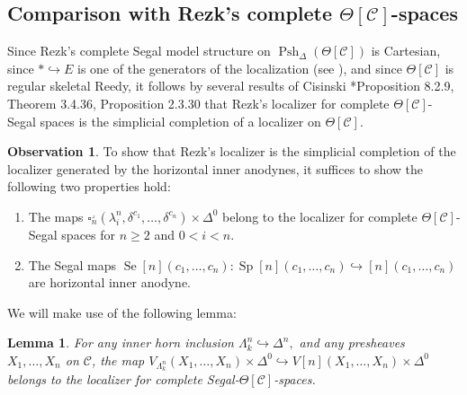 \documentclass[a4paper]{article}
\numberwithin{equation}{subsection}
\theoremstyle{plain}   %
\newtheorem{lemma}[equation]{Lemma}
\theoremstyle{definition}
\newtheorem{obs}[equation]{Observation}
\theoremstyle{remark}
\theoremstyle{plain}
\DeclareMathOperator{\Psh}{Psh}
\providecommand{\C}{}
\renewcommand{\C}{\ensuremath{\mathcal{C}}}
\begin{document}
\subsection{Comparison with Rezk's complete \(\Theta[\C]\)-spaces}\label{rezkcomparison}
Since Rezk's complete Segal model structure on \(\Psh_\Delta(\Theta[\C])\) is Cartesian, since \(\ast \hookrightarrow E\) is one of the generators of the localization (see \cite{rezk-theta-n-spaces}), and since \(\Theta[\C]\) is regular skeletal Reedy, it follows by several results of Cisinski \cite{cisinski-book}*{Proposition 8.2.9, Theorem 3.4.36, Proposition 2.3.30} that Rezk's localizer for complete \(\Theta[\C]\)-Segal spaces is the simplicial completion of a localizer on \(\Theta[\C]\).  
\begin{obs}
	To show that Rezk's localizer is the simplicial completion of the localizer generated by the horizontal inner anodynes, it suffices to show the following two properties hold:
	\begin{enumerate}[leftmargin=3em,label=(\roman*{})] 
		\item The maps 
		\(\square_n^\lrcorner(\lambda^n_i,\delta^{c_1},\dots,\delta^{c_n})\times \Delta^0\) belong to the localizer for complete \(\Theta[\C]\)-Segal spaces for \(n\geq 2\) and \(0<i<n\).
		\item The Segal maps \(\operatorname{Se}[n](c_1,\dots,c_n): \operatorname{Sp}[n](c_1,\dots,c_n) \hookrightarrow [n](c_1,\dots,c_n)\) are horizontal inner anodyne.
	\end{enumerate}
\end{obs}
We will make use of the following lemma:
\begin{lemma}\label{precatproperty}
	For any inner horn inclusion \(\Lambda^n_k\hookrightarrow \Delta^n,\) and any presheaves \(X_1,\dots,X_n\) on \(\C\), the map \(V_{\Lambda^n_k}(X_1,\dots,X_n)\times \Delta^0 \hookrightarrow V[n](X_1,\dots,X_n)\times \Delta^0\) belongs to the localizer for complete Segal-\(\Theta[\C]\)-spaces.
\end{lemma}
\end{document}
